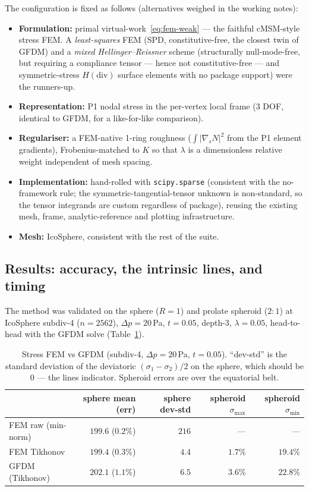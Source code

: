 \documentclass[11pt]{article}
\begin{document}
The configuration is fixed as follows (alternatives weighed in the working
notes):
\begin{itemize}[nosep]
  \item \textbf{Formulation:} primal virtual-work~\eqref{eq:fem-weak} ---
        the faithful cMSM-style stress FEM.  A \emph{least-squares} FEM (SPD,
        constitutive-free, the closest twin of GFDM) and a \emph{mixed
        Hellinger--Reissner} scheme (structurally null-mode-free, but requiring a
        compliance tensor --- hence not constitutive-free --- and
        symmetric-stress $H(\mathrm{div})$ surface elements with no package
        support) were the runners-up.
  \item \textbf{Representation:} P1 nodal stress in the per-vertex local frame
        ($3$ DOF, identical to GFDM, for a like-for-like comparison).
  \item \textbf{Regulariser:} a FEM-native 1-ring roughness
        ($\int|\nabla_s N|^2$ from the P1 element gradients), Frobenius-matched
        to $K$ so that $\lambda$ is a dimensionless relative weight independent
        of mesh spacing.
  \item \textbf{Implementation:} hand-rolled with \texttt{scipy.sparse}
        (consistent with the no-framework rule; the symmetric-tangential-tensor
        unknown is non-standard, so the tensor integrands are custom regardless
        of package), reusing the existing mesh, frame, analytic-reference and
        plotting infrastructure.
  \item \textbf{Mesh:} IcoSphere, consistent with the rest of the suite.
\end{itemize}
\subsection{Results: accuracy, the intrinsic lines, and timing}
\label{sec:fem-results}

The method was validated on the sphere ($R=1$) and prolate spheroid ($2{:}1$) at
IcoSphere subdiv-4 ($n=2562$), $\Delta p=20$\,Pa, $t=0.05$, depth-3,
$\lambda=0.05$, head-to-head with the GFDM solve (Table~\ref{tab:fem}).

\begin{table}[ht]\centering
\caption{Stress FEM vs GFDM (subdiv-4, $\Delta p=20$\,Pa, $t=0.05$).  ``dev-std''
is the standard deviation of the deviatoric $(\sigma_1-\sigma_2)/2$ on the sphere,
which should be $0$ --- the lines indicator.  Spheroid errors are over the
equatorial belt.}
\label{tab:fem}
\begin{tabular}{lrrrr}
\toprule
 & sphere mean (err) & sphere dev-std & spheroid $\sigma_{\max}$ & spheroid $\sigma_{\min}$ \\
\midrule
FEM raw (min-norm) & $199.6$ ($0.2\%$) & $216$  & ---      & ---       \\
FEM Tikhonov       & $199.4$ ($0.3\%$) & $4.4$  & $1.7\%$  & $19.4\%$  \\
GFDM (Tikhonov)    & $202.1$ ($1.1\%$) & $6.5$  & $3.6\%$  & $22.8\%$  \\
\bottomrule
\end{tabular}
\end{table}
\end{document}
